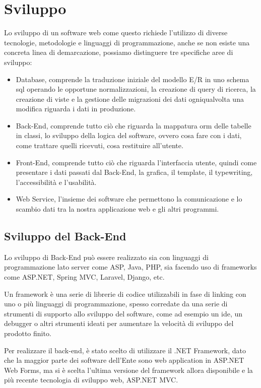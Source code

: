
\chapter{Sviluppo}

Lo sviluppo di un software web come questo richiede l'utilizzo di diverse tecnologie, metodologie e linguaggi di programmazione, anche se non esiste una concreta linea di demarcazione, possiamo distinguere tre specifiche aree di sviluppo:
\begin{itemize}
    \item Database, comprende la traduzione iniziale del modello E/R in uno schema \Gls{sql} operando le opportune normalizzazioni, la creazione di query di ricerca, la creazione di viste e la gestione delle migrazioni dei dati ogniqualvolta una modifica riguarda i dati in produzione.
	\item Back-End, comprende tutto ciò che riguarda la mappatura \Gls{orm} delle tabelle in classi, lo sviluppo della logica del software, ovvero cosa fare con i dati, come trattare quelli ricevuti, cosa restituire all'utente.
	\item Front-End, comprende tutto ciò che riguarda l'interfaccia utente, quindi come presentare i dati passati dal Back-End, la grafica, il template, il typewriting, l’accessibilità e l’usabilità.
	\item Web Service, l'insieme dei software che permettono la comunicazione e lo scambio dati tra la nostra applicazione web e gli altri programmi.
\end{itemize}



\section{Sviluppo del Back-End}

Lo sviluppo di Back-End può essere realizzato sia con linguaggi di programmazione lato server come ASP, Java, PHP, sia facendo uso di frameworks come ASP.NET, Spring MVC, Laravel, Django, etc. 

Un framework è una serie di librerie di codice utilizzabili in fase di linking con uno o più linguaggi di programmazione, spesso corredate da una serie di strumenti di supporto allo sviluppo del software, come ad esempio un \Gls{ide}, un debugger o altri strumenti ideati per aumentare la velocità di sviluppo del prodotto finito.

Per realizzare il back-end, è stato scelto di utilizzare il .NET Framework, dato che la maggior parte dei software dell'Ente sono web application in ASP.NET Web Forms, ma si è scelta l'ultima versione del framework allora disponibile e la più recente tecnologia di sviluppo web, ASP.NET MVC.

